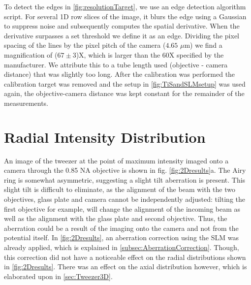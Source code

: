 To detect the edges in \cref{fig:resolutionTarget}, we use an edge detection algorithm script.
For several 1D row slices of the image, it blurs the edge using a Gaussian to suppress noise and subsequently computes the spatial derivative. 
When the derivative surpasses a set threshold we define it as an edge.
Dividing the pixel spacing of the lines by the pixel pitch of the camera ($4.65$ $\mu$m) we find a magnification of ($67 \pm 3$)X, which is larger than the 60X specified by the manufacturer. 
We attribute this to a tube length used (objective - camera distance) that was slightly too long.
After the calibration was performed the calibration target was removed and the setup in \cref{fig:TiSandSLMsetup} was used again, the objective-camera distance was kept constant for the remainder of the measurements.

\section{Radial Intensity Distribution}\label{sec:TweezerRadial}

An image of the tweezer at the point of maximum intensity imaged onto a camera through the 0.85 NA objective is shown in fig. \ref{fig:2Dresults}a. 
The Airy ring is somewhat asymmetric, suggesting a slight tilt aberration is present.
This slight tilt is difficult to eliminate, as the alignment of the beam with the two objectives, glass plate and camera cannot be independently adjusted: tilting the first objective for example, will change the alignment of the incoming beam as well as the alignment with the glass plate and second objective.
Thus, the aberration could be a result of the imaging onto the camera and not from the potential itself.
In \cref{fig:2Dresults}, an aberration correction using the \ac{SLM} was already applied, which is explained in \cref{subsec:AberrationCorrection}. 
Though, this correction did not have a noticeable effect on the radial distributions shown in \cref{fig:2Dresults}.
There was an effect on the axial distribution however, which is elaborated upon in \cref{sec:Tweezer3D}.

